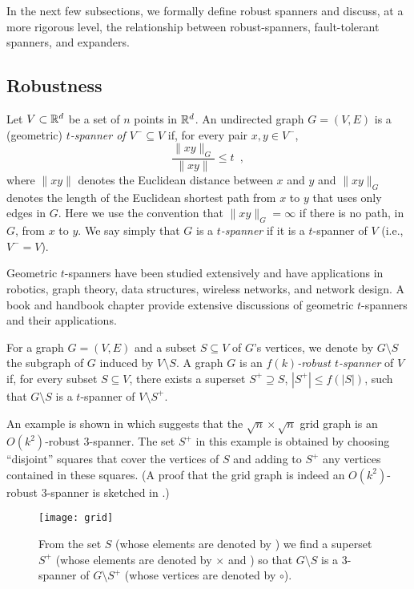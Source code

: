 \documentclass{sig-alternate}
\makeatletter
\def\ScaleIfNeeded{%
\ifdim\Gin@nat@width>.97\linewidth
.97\linewidth
\else
\Gin@nat@width
\fi
}
\makeatother
\begin{document}
In the next few subsections, we formally define robust spanners
and discuss, at a more rigorous level, the relationship between
robust-spanners, fault-tolerant spanners, and expanders.

\subsection{Robustness}

Let $V\subset \mathbb{R}^d$ be a set of $n$ points in $\mathbb{R}^d$.  An undirected
graph $G=(V,E)$ is a (geometric) \emph{$t$-spanner of $V^-\subseteq V$}
if, for every pair $x,y\in V^-$,
\[
  \frac{\|xy\|_G}{\|xy\|} \le t \enspace ,
\]
where $\|xy\|$ denotes the Euclidean distance between $x$ and $y$ and
$\|xy\|_G$ denotes the length of the Euclidean shortest path from $x$
to $y$ that uses only edges in $G$.  Here we use the convention that
$\|xy\|_G=\infty$ if there is no path, in $G$, from $x$ to $y$.  We say
simply that $G$ is a \emph{$t$-spanner} if it is a $t$-spanner of $V$
(i.e., $V^-=V$).

Geometric $t$-spanners have been studied extensively and have applications
in robotics, graph theory, data structures, wireless networks, and network
design.  A book \cite{ns07} and handbook chapter \cite{e99} provide
extensive discussions of geometric $t$-spanners and their applications.

For a graph $G=(V,E)$ and a subset $S\subseteq V$ of $G$'s vertices, we
denote by $G\setminus S$ the subgraph of $G$ induced by $V\setminus S$.
A graph $G$ is an \emph{$f(k)$-robust $t$-spanner} of $V$ if, for every
subset $S\subseteq V$, there exists a superset $S^+\supseteq S$, $|S^+|\le
f(|S|)$, such that $G\setminus S$ is a $t$-spanner of $V\setminus S^+$.

An example is shown in  which suggests that the
$\sqrt{n}\times\sqrt{n}$ grid graph is an $O(k^2)$-robust 3-spanner.
The set $S^+$ in this example is obtained by choosing ``disjoint''
squares that cover the vertices of $S$ and adding to $S^+$ any vertices
contained in these squares.  (A proof that the grid graph is indeed an
$O(k^2)$-robust 3-spanner is sketched in .)

\begin{figure}
  \begin{center}
    \texttt{[image: grid]}
  \end{center}
  \caption{From the set $S$ (whose elements are denoted by \textbullet)
  we find a superset $S^+$ (whose elements are denoted by $\times$ and
  \textbullet) so that $G\setminus S$ is a 3-spanner of $G\setminus S^+$
  (whose vertices are denoted by $\circ$).}
\end{figure}
\end{document}
